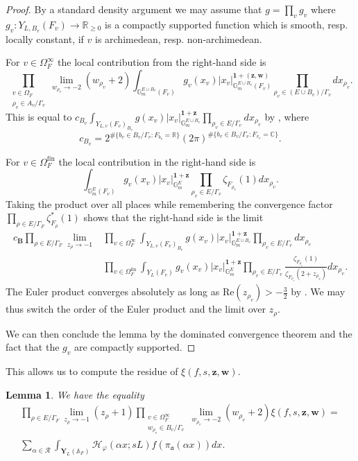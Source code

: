 \documentclass[a4paper,11pt,reqno]{amsart}
\newcommand{\R}{\mathbb{R}}
\newcommand{\C}{\mathbb{C}}
\newcommand{\G}{\mathbb{G}}
\newcommand{\A}{\mathbb{A}}
\renewcommand{\Re}{\mathrm{Re}}
\newtheorem{lemma}[theorem]{Lemma}
\theoremstyle{definition}
\begin{document}
\begin{proof}
	By a standard density argument we may assume that $g = \prod_v g_v$ where $g_v: Y_{L, B_v}(F_v) \to \R_{\geq 0}$ is a compactly supported function which is smooth, resp. locally constant, if $v$ is archimedean, resp. non-archimedean.
	
	For $v \in \Omega_{F}^{\infty}$ the local contribution from the right-hand side is
	\[
	\prod_{\substack{v \in \Omega_F \\ \rho_v \in A_v/\Gamma_v}} \lim_{w_{\rho_v} \to -2}(w_{\rho_v} + 2) \int_{\G_m^{E \cup B_v}(F_v)} g_v(x_v)|x_v|_{\G_m^{E \cup B_v}(F_v)}^{\mathbf{1} + (\bm{z}, \bm{w})} \prod_{\rho_v \in (E \cup B_v)/\Gamma_v} dx_{\rho_v}.
	\]
	This is equal to $c_{B_v} \int_{Y_{L,v}(F_v)_{B_v}} g(x_v) |x_v|_{\G_m^{E \cup B_v}}^{\mathbf{1} + \bm{z}} \prod_{\rho_v \in E/\Gamma_v} dx_{\rho_v}$ by \cite[Prop.~3.4]{Chambert-Loir2010Igusa}, where 
	\[
	c_{B_v} = 2^{\# \{b_v \in B_v / \Gamma_v : F_{b_v} = \R\}} (2 \pi)^{\# \{b_v \in B_v / \Gamma_v : F_{v_v} = \C\}}.
	\]
	
	For $v \in \Omega_{F}^{\text{fin}}$ the local contribution in the right-hand side is 
	\[
	\int_{\G_m^{E}(F_v)} g_v(x_v)|x_v|_{\G_m^{E}}^{\mathbf{1} +\bm{z}} \prod_{\rho_v \in E /\Gamma_v} \zeta_{F_{\rho_v}}(1) dx_{\rho_v}.
	\] 
	Taking the product over all places while remembering the convergence factor $\prod_{\rho \in E/ \Gamma_F} \zeta^*_{F_{\rho}}(1)$ shows that the right-hand side is the limit
	\[
	\begin{split}
		c_{\mathbf{B}} \prod_{\rho \in E / \Gamma_F} \lim_{z_{\rho} \to -1}
		&\prod_{v \in \Omega_{F}^{\infty}} \int_{Y_{L,v}(F_v)_{B_v}} g(x_v) |x_v|_{\G_m^{E \cup B_v}}^{\mathbf{1} + \bm{z}} \prod_{\rho_v \in E/\Gamma_v} dx_{\rho_v} \\
		&\prod_{v \in \Omega_{F}^{\text{fin}}} \int_{Y_L(F_v)} g_v(x_v)|x_v|_{\G_m^{E}}^{\mathbf{1} +\bm{z}} \prod_{\rho_v \in E /\Gamma_v} \frac{\zeta_{F_{\rho_v}}(1)}{\zeta_{F_{\rho_v}}(2 + z_{\rho_v})} dx_{\rho_v}.
	\end{split}
	\]
	The Euler product converges absolutely as long as $\Re(z_{\rho_v}) > - \frac{3}{2}$ by \cite[\S4.3.3]{Chambert-Loir2010Igusa}. We may thus switch the order of the Euler product and the limit over $z_{\rho}$.
	
	We can then conclude the lemma by the dominated convergence theorem and the fact that the $g_v$ are compactly supported.
\end{proof}
This allows us to compute the residue of $\xi(f, s, \bm{z}, \bm{w})$.
\begin{lemma}\label{lem:Taking the limit of the z's and w's}
	We have the equality
	\[
	\begin{split}
		\prod_{\rho \in E / \Gamma_F} \lim_{z_{\rho} \to -1}(z_{\rho} + 1) \prod_{\substack{v \in \Omega_{F}^{\infty} \\ w_{\rho_v} \in B_v / \Gamma_v}} \lim_{w_{\rho_v} \to - 2}(w_{\rho_v} + 2) \xi(f, s, \bm{z}, \bm{w}) = \\
		\sum_{\alpha \in \mathcal{R}} \int_{\mathbf{Y}_L(\A_F)} \mathcal{H}_{\varphi}(\alpha x ; sL) f(\pi_{\mathfrak{a}}(\alpha x)) d x.
	\end{split}
	\]
\end{lemma}
\end{document}
